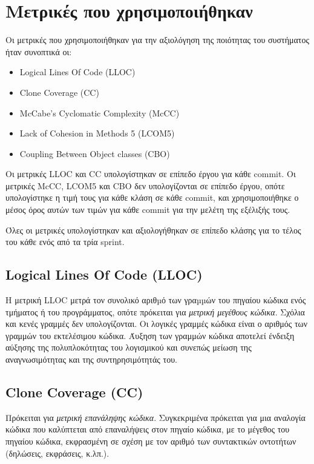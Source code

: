 \section{Μετρικές που χρησιμοποιήθηκαν}

Οι μετρικές που χρησιμοποιήθηκαν για την αξιολόγηση της ποιότητας του
συστήματος ήταν συνοπτικά οι:
\begin{itemize}
	\item Logical Lines Of Code (LLOC)
	\item Clone Coverage (CC)
	\item McCabe's Cyclomatic Complexity (McCC)
	\item Lack of Cohesion in Methods 5 (LCOM5)
	\item Coupling Between Object classes (CBO)
\end{itemize}

Οι μετρικές LLOC και CC υπολογίστηκαν σε επίπεδο έργου για κάθε commit.
Οι μετρικές McCC, LCOM5 και CBO δεν υπολογίζονται σε επίπεδο έργου,
οπότε υπολογίστηκε η τιμή τους για κάθε κλάση σε κάθε commit, και
χρησιμοποιήθηκε ο μέσος όρος αυτών των τιμών για κάθε commit για την
μελέτη της εξέλιξής τους.

Όλες οι μετρικές υπολογίστηκαν και αξιολογήθηκαν σε επίπεδο κλάσης για
το τέλος του κάθε ενός από τα τρία sprint.

\subsection{Logical Lines Of Code (LLOC)}

Η μετρική LLOC μετρά τον συνολικό αριθµό των γραµµών του πηγαίου κώδικα
ενός τμήματος ή του προγράμματος, οπότε πρόκειται για \emph{μετρική
μεγέθους κώδικα}. Σχόλια και κενές γραμμές δεν υπολογίζονται. Οι
λογικές γραμμές κώδικα είναι ο αριθμός των γραμμών του εκτελέσιμου
κώδικα. Άυξηση των γραμμών κώδικα αποτελεί
ένδειξη αύξησης της πολυπλοκότητας του λογισμικού και συνεπώς μείωση της
αναγνωσιμότητας και της συντηρησιμότητάς του.

\subsection{Clone Coverage (CC)}

Πρόκειται για \emph{μετρική επανάληψης κώδικα}. Συγκεκριμένα πρόκειται
για μια αναλογία κώδικα που καλύπτεται από επαναλήψεις στον πηγαίο
κώδικα, με το μέγεθος του πηγαίου κώδικα, εκφρασμένη σε σχέση με τον
αριθμό των συντακτικών οντοτήτων (δηλώσεις, εκφράσεις, κ.λπ.).

